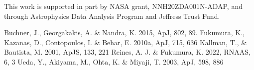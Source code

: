 \documentclass[12pt,preprint]{aastex631}
\begin{document}
\hfill
  \newpage
  
This work is supported in part by NASA grant, NNH20ZDA001N-ADAP, and through Astrophysics Data Analysis Program and Jeffress Trust Fund.

\begin{thebibliography}{999}
 Buchner, J., Georgakakis, A. \&  Nandra, K. 2015, ApJ, 802, 89.
 Fukumura, K., Kazanas, D., Contopoulos, I. \& Behar, E. 2010a, ApJ, 715, 636 
 Kallman, T., \& Bautista, M. 2001, ApJS, 133, 221
 Reines, A. J. \& Fukumura, K. 2022, RNAAS, 6, 3
 Ueda, Y., Akiyama, M., Ohta, K. \& Miyaji, T. 2003, ApJ, 598, 886

\end{thebibliography}
\end{document}
